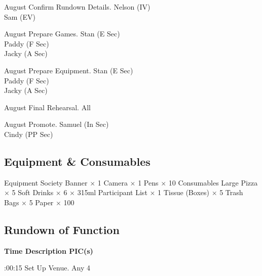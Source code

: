 \bTR{}
\eTD{} August
\eTD\bTD Confirm Rundown Details.
\eTD\bTD Nelson (IV) \\ Sam (EV)
\eTD\eTR

\bTR{}
\eTD{} August
\eTD\bTD Prepare Games.
\eTD\bTD Stan (E Sec) \\ Paddy (F Sec) \\ Jacky (A Sec)
\eTD\eTR

\bTR{}
\eTD{} August
\eTD\bTD Prepare Equipment.
\eTD\bTD Stan (E Sec) \\ Paddy (F Sec) \\ Jacky (A Sec)
\eTD\eTR

\bTR{}
\eTD{} August
\eTD\bTD Final Rehearsal.
\eTD\bTD All
\eTD\eTR

\bTR{}
\eTD{} August
\eTD\bTD Promote.
\eTD\bTD Samuel (In Sec) \\ Cindy (PP Sec)
\eTD\eTR

\eTABLEbody
\eTABLE

\subsection{Equipment \& Consumables}
\starttabulate[|l|l|]
\NC{}Equipment\NC\NR
\HL
\NC Society Banner          \NC $\times$ 1  \NR
\NC Camera                  \NC $\times$ 1  \NR
\NC Pens                    \NC $\times$ 10 \NR
\HL
\NR
\NC{}Consumables\NC\NR
\HL
\NC Large Pizza             \NC $\times$ 5      \NR
\NC Soft Drinks              $\times$ 6 $\times$ 315ml \NR
\NC Participant List        \NC $\times$ 1      \NR
\NC Tissue (Boxes)          \NC $\times$ 5      \NR
\NC Trash Bags              \NC $\times$ 5      \NR
\NC Paper                   \NC $\times$ 100    \NR
\HL
\stoptabulate

\subsection{Rundown of Function}

\setupTABLE[c][1][width=1.25in]
\setupTABLE[c][2][width=3.5in]
\setupTABLE[c][3][width=1.25in]
\bTABLE
\bTABLEhead

\bTR\bTH    \bf{Time}
\eTH\bTH    \bf{Description}
\eTH\bTH    \bf{PIC(s)}
\eTH\eTR

\eTABLEhead
\bTABLEbody

\bTR{}:00:15
\eTD\bTD Set Up Venue.
\eTD\bTD Any 4
\eTD\eTR

